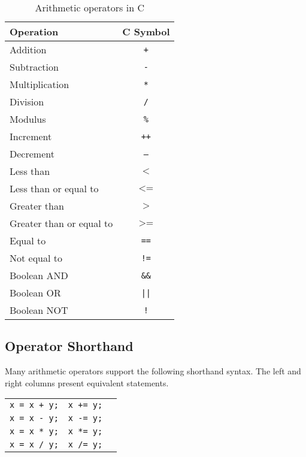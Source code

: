 \documentclass{lab}
\begin{document}
\begin{multicols}{2}
\begin{table}[H]
\centering
\begin{tabular}{|l|c|}
\hline
Operation      & C Symbol \\
\hline
Addition       & \texttt{+}        \\
Subtraction    & \texttt{-}        \\
Multiplication & \texttt{*}        \\
Division       & \texttt{/}       \\
Modulus		   & \texttt{\%}	\\
Increment	& \texttt{++}	\\
Decrement	& \texttt{--} \\
Less than       & $\texttt{<}$        \\
Less than or equal to    & $\texttt{<=}$\\
Greater than & $\texttt{>}$        \\
Greater than or equal to       & $\texttt{>=}$ \\
Equal to & \texttt{==} \\
Not equal to & \texttt{!=} \\
Boolean AND & \texttt{\&\&} \\
Boolean OR & \texttt{||} \\
Boolean NOT & \texttt{!} \\
\hline
\end{tabular}
\caption{Arithmetic operators in C}
\end{table}

\columnbreak
\subsection{Operator Shorthand}

Many arithmetic operators support the following shorthand syntax. The left and right columns present equivalent statements.

\begin{table}[H]
\centering
\begin{tabular}{|c|c|c|}
\hline
\texttt{x = x + y;} & \texttt{x += y;} \\
\texttt{x = x - y;} & \texttt{x -= y;} \\
\texttt{x = x * y;} & \texttt{x *= y;} \\
\texttt{x = x / y;} & \texttt{x /= y;} \\
\hline
\end{tabular}
\end{table}


\end{multicols}
\end{document}
